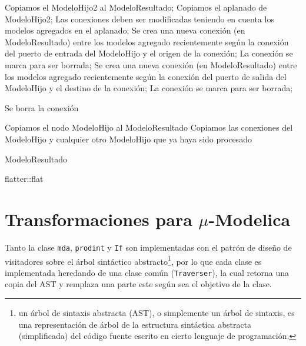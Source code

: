 \begin{algorithm}[H]
\begin{algorithmic}[1]
  			 		\State Copiamos el ModeloHijo2 al ModeloResultado;
				\Else
  			 		\State Copiamos el aplanado de ModeloHijo2;
				\EndIf
  			 			\State Las conexiones deben ser modificadas teniendo en cuenta los modelos agregados en el aplanado;
					\EndIf
  			 			\State Se crea una nueva conexión (en ModeloResultado) entre los modelos agregado recientemente según la conexión del puerto de entrada del ModeloHijo y el origen de la conexión;
  			 			\State La conexión se marca para ser borrada;
					\EndIf
  			 			\State Se crea una nueva conexión (en ModeloResultado) entre los modelos agregado recientemente según la conexión del puerto de salida del ModeloHijo y el destino de la conexión;
  			 			\State La conexión se marca para ser borrada;
					\EndIf
						
						\State Se borra la conexión
					\EndIf
				\EndFor
		\EndFor
  	\Else

  		\State Copiamos el nodo ModeloHijo al ModeloResultado 
  		\State Copiamos las conexiones del ModeloHijo y cualquier otro ModeloHijo que ya haya sido procesado

	\EndIf
\EndFor
\Return ModeloResultado
\end{algorithmic}
\caption{flatter::flat}
\end{algorithm}

 
\section{Transformaciones para $\mu$-Modelica} \label{sec:transform}
	Tanto la clase \texttt{mda}, \texttt{prodint} y \texttt{If} son implementadas con el patrón de diseño de visitadores sobre 
	el árbol sintáctico abstracto\footnote{un árbol de sintaxis abstracta (AST), o simplemente un árbol de sintaxis, es una representación 
	de árbol de la estructura sintáctica abstracta (simplificada) del código fuente escrito en cierto lenguaje de programación.}, por lo que 
	cada clase es implementada heredando de una clase común (\texttt{Traverser}), la cual retorna una copia del AST y remplaza una parte este según sea el 
	objetivo de la clase.
	
